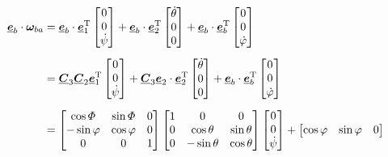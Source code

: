 \begin{align}
	\underline{\bm{e}}_b \cdot \bm{\omega}_{ba} &= \underline{\bm{e}}_b \cdot \underline{\bm{e}}_1^{\text{T}} 
	\begin{bmatrix}
		0 \\
		0 \\
		\dot{\psi}
	\end{bmatrix}
	+ \underline{\bm{e}}_b \cdot \underline{\bm{e}}_2^{\text{T}} 
	\begin{bmatrix}
		\dot{\theta} \\
		0 \\
		0
	\end{bmatrix}
	+ \underline{\bm{e}}_b \cdot \underline{\bm{e}}_b^{\text{T}} 
	\begin{bmatrix}
		0 \\
		0 \\
		\dot{\varphi}
	\end{bmatrix} \notag \\[0.5em]
	& = \underline{\bm{C}}_3 \underline{\bm{C}}_2 \underline{\bm{e}}_1^{\text{T}} 
	\begin{bmatrix}
		0 \\
		0 \\
		\dot{\psi}
	\end{bmatrix}
	+ \underline{\bm{C}}_3 \underline{\bm{e}}_2 \cdot \underline{\bm{e}}_2^{\text{T}} 
	\begin{bmatrix}
		\dot{\theta} \\
		0 \\
		0
	\end{bmatrix}
	+ \underline{\bm{e}}_b \cdot \underline{\bm{e}}_b^{\text{T}} 
	\begin{bmatrix}
		0 \\
		0 \\
		\dot{\varphi}
	\end{bmatrix} \notag \\[0.5em]
	&=
	\begin{bmatrix}
		\cos \varPhi & \sin \varPhi & 0 \\
		- \sin \varphi & \cos \varphi & 0 \\
		0 & 0 & 1
	\end{bmatrix}
	\begin{bmatrix}
		1 & 0 & 0 \\
		0 & \cos \theta & \sin \theta \\
		0 & - \sin \theta & \cos \theta 
	\end{bmatrix}
	\begin{bmatrix}
		0 \\
		0 \\
		\dot{\psi}
	\end{bmatrix}
	+
	\begin{bmatrix}
		\cos \varphi & \sin \varphi & 0 \\

\end{bmatrix}
\end{align}
